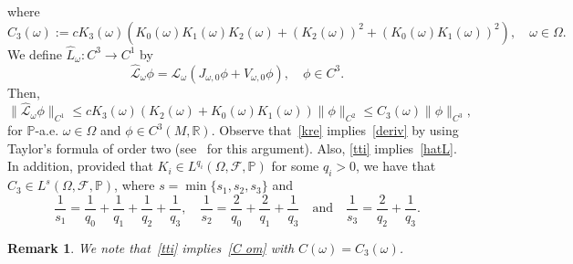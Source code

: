 \documentclass[11pt,reqno,a4paper]{article}
\theoremstyle{special}
\newtheorem{remark}[theorem]{Remark}
\renewcommand{\L}{\mathcal{L}}
\def\R{\mathbb{R}}
\def\om{\omega}
\begin{document}
 where
 \begin{equation}\label{C 3 def}
  C_3(\omega):=cK_3(\omega)(K_0(\omega)K_1(\omega)K_2(\omega)+(K_2(\omega))^2+ (K_0(\omega)K_1(\omega))^2), \quad \omega \in \Omega.    
 \end{equation}
 We define $\hat L_\omega \colon C^3 \to C^1$ by 
 \[
 \hat{\L}_\omega \phi=\L_\omega(J_{\omega, 0} \phi+V_{\omega, 0}\phi), \quad \phi \in C^3.
 \]
 Then, 
 \begin{equation}\label{tti}
 \| \hat{\L}_\omega \phi \|_{C^1} \le cK_3(\omega) (K_2(\omega)+K_0(\omega)K_1(\omega))\| \phi \|_{C^2} \le  C_3(\omega)\| \phi \|_{C^3},
 \end{equation}
 for $\mathbb P$-a.e. $\omega \in \Omega$ and $\phi \in C^3(M, \R)$.
 Observe that~\eqref{kre} implies~\eqref{deriv} by using Taylor's formula of order two (see~\cite{DGS} for this argument). Also, \eqref{tti} implies~\eqref{hatL}.
 In addition, 
 provided that $K_i\in L^{q_i}(\Omega, \mathcal F, \mathbb P)$ for some $q_i>0$, we have that $C_3\in L^s(\Omega, \mathcal F, \mathbb P)$, where $s=\min \{s_1, s_2, s_3\}$ and
 \[
 \frac{1}{s_1}=\frac{1}{q_0}+\frac{1}{q_1}+\frac{1}{q_2}+\frac{1}{q_3}, \quad  \frac{1}{s_2}=\frac{2}{q_0}+\frac{2}{q_1}+\frac{1}{q_3} \quad  \text{and} \quad  \frac{1}{s_3}=\frac{2}{q_2}+\frac{1}{q_3}.
 \]
 \begin{remark}
We note that~\eqref{tti} implies~\eqref{C om} with $C(\om)=C_3(\om)$.
 \end{remark}
 
\end{document}
